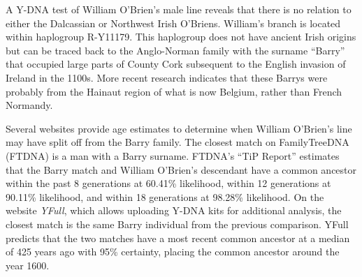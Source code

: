 
A Y-DNA test of William O'Brien's male line\cite{BigY} reveals that there is no relation to either the Dalcassian or Northwest Irish O'Briens. William's branch is located within haplogroup R-Y11179. This haplogroup does not have ancient Irish origins but can be traced back to the Anglo-Norman family with the surname ``Barry'' that occupied large parts of County Cork subsequent to the English invasion of Ireland in the 1100s.\cite{BarrymoreDNA:9} More recent research indicates that these Barrys were probably from the Hainaut region of what is now Belgium, rather than French Normandy.\cite{BarrymoreDNA:2-4}

Several websites provide age estimates to determine when William O'Bri\-en's line may have split off from the Barry family. The closest match on FamilyTreeDNA (FTDNA) is a man with a Barry surname. FTDNA's ``TiP Report'' estimates that the Barry match and William O'Brien's descendant have a common ancestor within the past 8 generations at 60.41\% likelihood, within 12 generations at 90.11\% likelihood, and within 18 generations at 98.28\% likelihood.\cite{TiP} On the website \textit{YFull}, which allows uploading Y-DNA kits for additional analysis, the closest match is the same Barry individual from the previous comparison. YFull predicts that the two matches have a most recent common ancestor at a median of 425 years ago with 95\% certainty, placing the common ancestor around the year 1600.\cite{YFull}

